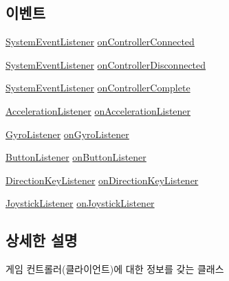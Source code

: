 \subsection*{이벤트}
\begin{DoxyCompactItemize}
\item 
\hyperlink{class_game_controller_a6c79406c908b41c4f4520c6789d829e6}{System\+Event\+Listener} \hyperlink{class_game_controller_a32dbe49ae40c100cac70423e2ac81aa7}{on\+Controller\+Connected}
\item 
\hyperlink{class_game_controller_a6c79406c908b41c4f4520c6789d829e6}{System\+Event\+Listener} \hyperlink{class_game_controller_aca9c2b01d155e895c249ac05e1eb9bf4}{on\+Controller\+Disconnected}
\item 
\hyperlink{class_game_controller_a6c79406c908b41c4f4520c6789d829e6}{System\+Event\+Listener} \hyperlink{class_game_controller_a1bd8fb1c7e90146c8bbc25615ffcd4e5}{on\+Controller\+Complete}
\item 
\hyperlink{class_game_controller_a87b7db4c19ae1dd2ecbf94c6f1be5c90}{Acceleration\+Listener} \hyperlink{class_game_controller_a2c93984c2eab77efd735468a234d4a77}{on\+Acceleration\+Listener}
\item 
\hyperlink{class_game_controller_a5e0106b2e58b70c011fe7f7e9f58ecce}{Gyro\+Listener} \hyperlink{class_game_controller_ae051ab28fdc0f6bf06d1c5fbb4ad3f21}{on\+Gyro\+Listener}
\item 
\hyperlink{class_game_controller_a0d4534f57395c87d869dc90a70419e7f}{Button\+Listener} \hyperlink{class_game_controller_a8573dccb810a91d3e1b571f72e321849}{on\+Button\+Listener}
\item 
\hyperlink{class_game_controller_ae08375a6caed9e49d310f992e6d6f61b}{Direction\+Key\+Listener} \hyperlink{class_game_controller_aa9886181132e7d48bea03ffd147eafc0}{on\+Direction\+Key\+Listener}
\item 
\hyperlink{class_game_controller_a653ceafbd20d279abc65adf386a358aa}{Joystick\+Listener} \hyperlink{class_game_controller_a4ac337d799821aba5064e4e91c565eb9}{on\+Joystick\+Listener}
\end{DoxyCompactItemize}


\subsection{상세한 설명}
게임 컨트롤러(클라이언트)에 대한 정보를 갖는 클래스

